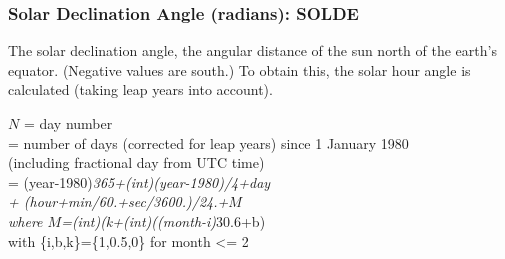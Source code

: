 \documentclass[
]{book}
\begin{document}
\hypertarget{solde}{%
\subsubsection*{Solar Declination Angle (radians): SOLDE}\label{solde}}

The solar declination angle, the angular distance of the sun north of the earth's equator. (Negative values are south.) To obtain this, the solar hour angle is calculated (taking leap years into account).

\(N\) = day number\\
\hspace*{0.333em}\hspace*{0.333em}\hspace*{0.333em}\hspace*{0.333em}= number of days (corrected for leap years) since 1 January 1980\\
\hspace*{0.333em}\hspace*{0.333em}\hspace*{0.333em}\hspace*{0.333em}\hspace*{0.333em}\hspace*{0.333em}\hspace*{0.333em}(including fractional day from UTC time)\\
\hspace*{0.333em}\hspace*{0.333em}\hspace*{0.333em}= (year-1980)\emph{365+(int)(year-1980)/4+day\\
\hspace*{0.333em}\hspace*{0.333em}\hspace*{0.333em}\hspace*{0.333em}\hspace*{0.333em}\hspace*{0.333em}+ (hour+min/60.+sec/3600.)/24.+\(M\)\\
\hspace*{0.333em}\hspace*{0.333em}\hspace*{0.333em}where \(M\)=(int)(k+(int)((month-i)}30.6+b)\\
\hspace*{0.333em}\hspace*{0.333em}\hspace*{0.333em}\hspace*{0.333em}\hspace*{0.333em}\hspace*{0.333em}with \{i,b,k\}=\{1,0.5,0\} for month \textless= 2\\
\end{document}
